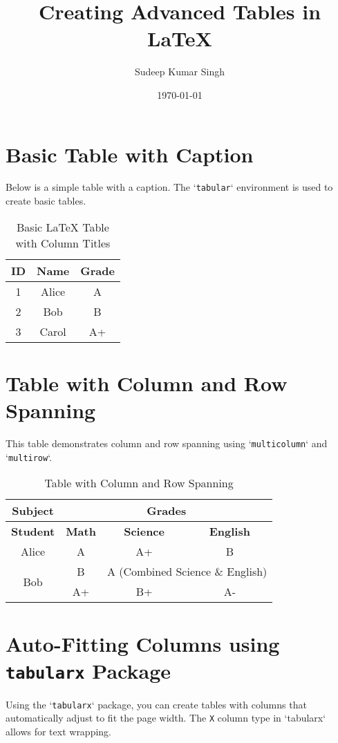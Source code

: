 \documentclass[12pt]{article}
\title{Creating Advanced Tables in LaTeX}
\author{Sudeep Kumar Singh}
\date{\today}
\begin{document}
\maketitle

\section{Basic Table with Caption}
Below is a simple table with a caption. The `\texttt{tabular}` environment is used to create basic tables.

\begin{table}[h!]
    \centering
    \caption{Basic LaTeX Table with Column Titles}
    \begin{tabular}{|c|c|c|}
        \hline
        \textbf{ID} & \textbf{Name} & \textbf{Grade} \\
        \hline
        1 & Alice & A \\
        \hline
        2 & Bob & B \\
        \hline
        3 & Carol & A+ \\
        \hline
    \end{tabular}
\end{table}

\section{Table with Column and Row Spanning}
This table demonstrates column and row spanning using `\texttt{multicolumn}` and `\texttt{multirow}`.

\begin{table}[h!]
    \centering
    \caption{Table with Column and Row Spanning}
    \begin{tabular}{|c|c|c|c|}
        \hline
        \textbf{Subject} & \multicolumn{3}{|c|}{\textbf{Grades}} \\
        \hline
        \textbf{Student} & \textbf{Math} & \textbf{Science} & \textbf{English} \\
        \hline
        Alice & A & A+ & B \\
        \hline
        \multirow{2}{*}{Bob} & B & \multicolumn{2}{|c|}{A (Combined Science \& English)} \\
        \cline{2-4}
         & A+ & B+ & A- \\
        \hline
    \end{tabular}
\end{table}

\section{Auto-Fitting Columns using \texttt{tabularx} Package}
Using the `\texttt{tabularx}` package, you can create tables with columns that automatically adjust to fit the page width. The \texttt{X} column type in `tabularx` allows for text wrapping.
\end{document}

